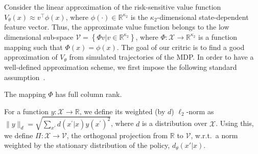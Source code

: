 Consider the linear approximation of the risk-sensitive value function $V_\theta(x)\approx v^\top\phi(x)$, where $\phi(\cdot)\in\mathbb R^{\kappa_2}$ is the $\kappa_2$-dimensional state-dependent feature vector. Thus, the approximate value function belongs to the low dimensional sub-space $\mathcal{V}=\left\{\Phi v|v\in\mathbb R^{\kappa_2}\right\}$, where $\Phi:\mathcal X\rightarrow\mathbb R^{\kappa_2}$ is a function mapping such that $\Phi(x)=\phi(x)$. %
The goal of our critric is to find a good approximation of $V_\theta$ from simulated trajectories of the MDP. In order to have a well-defined approximation scheme, we first impose the following standard assumption~\citep{BT96}.
%
\begin{assumption}
The mapping $\Phi$ has full column rank.
\end{assumption}
%
For a function $y:\mathcal X\rightarrow\mathbb R$, we define its weighted (by $d$) $\ell_2$-norm as $\|y\|_d=\sqrt{\sum_{x'}d(x^\prime|x)y(x^\prime)^2}$, where $d$ is a distribution over $\mathcal X$. Using this, we define $\Pi:\mathcal X\rightarrow\mathcal{V}$, the orthogonal projection from $\mathbb R$ to $\mathcal V$, w.r.t.~a norm weighted by the stationary distribution of the policy, $d_\theta(x'|x)$.

